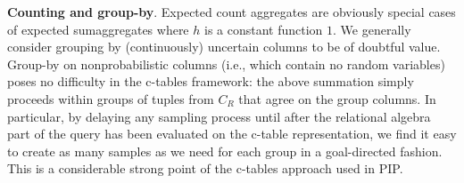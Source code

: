 {\bf Counting and group-by}\/.
Expected count aggregates are obviously special cases of expected sumaggregates where $h$ is a constant function $1$. We generally consider grouping by (continuously) uncertain columns to be of doubtful value. Group-by on nonprobabilistic columns (i.e., which contain no random variables) poses no difficulty in the c-tables framework: the above summation simply proceeds within groups of tuples from $C_R$ that agree on the group columns. In particular, by delaying any sampling process until after the relational algebra part of the query has been evaluated on the c-table representation, we find it easy to create as many samples as we need for each group in a goal-directed fashion. This is a considerable strong point of the c-tables approach used in PIP.



